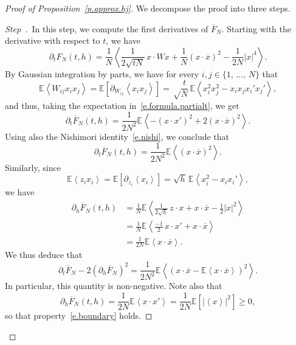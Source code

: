 \documentclass[10pt]{amsart}
\theoremstyle{definition}\newtheorem{defi}[theo]{Definition}\newtheorem{rema}[theo]{Remark}\newtheorem{exam}[theo]{Example}\newtheorem{exem}[theo]{Example}\newtheorem{nota}[theo]{Notation}
\newcommand{\E}{\mathbb{E}}
\newcommand{\1}{\mathds{1}}
\renewcommand{\ge}{\geqslant}
\newcommand{\la}{\left\langle}
\newcommand{\ra}{\right\rangle}
\renewcommand{\bar}{\overline}
\newcounter{stepcount}
\newenvironment{step}{\refstepcounter{stepcount}\begin{proof}[Step~\thestepcount]}{\let\qed\relax\end{proof}}
\begin{document}
\begin{proof}[Proof of Proposition~\ref{p.approx.hj}]
We decompose the proof into three steps.



\begin{step}\label{st1}
\,In this step, we compute the first derivatives of $\bar F_N$. Starting with the derivative with respect to $t$, we have
\begin{equation}\label{e.formula.partialt}
\partial_t F_N(t,{h}) = \frac 1 N\la \frac {1} {2\sqrt {t N}} \, x \cdot W x + \frac 1 N (x\cdot \bar x)^2 - \frac 1 {2N} |x|^4 \ra.
\end{equation}
By Gaussian integration by parts, we have for every $i,j \in \{1,\,\ldots,\,N\}$ that
\[
\E\la W_{ij} x_i x_j\ra  = \E \left[\partial_{W_{ij}} \la x_i x_j \ra \right] = \sqrt \frac{t}{N} \, \E \la x_i^2 x_j^2 - x_i x_j x_i' x_j' \ra,
\]
and thus, taking the expectation in~\eqref{e.formula.partialt}, we get
\[
\partial_t \bar F_N(t,{h}) = \frac {1}{2N^2} \E\la - \left(x \cdot x'\right)^2 + 2 \left(x\cdot \bar x\right)^2\ra.
\]
Using also the Nishimori identity~\eqref{e.nishi}, we conclude that
\begin{equation}\label{e.formula.partialtbar}
\partial_t \bar F_N(t,{h}) = \frac 1 {2N^2} \E \la (x \cdot \bar x)^2 \ra.
\end{equation}
Similarly, since
\begin{equation}\label{e.ibp.z}
\E \la z_i x_i \ra  = \E \left[\partial_{z_i} \la x_i \ra \right] = \sqrt{h} \, \E \la x_i^2 - x_i x_i' \ra,
\end{equation}
we have
\begin{align}
\partial_{h} \bar F_N(t,{h}) 
&=\frac 1 N \E \la \frac 1 {2\sqrt {h}} \, z \cdot x + x \cdot \bar x - \frac 1 2 |x|^2 \ra\label{e.formula.partialmu1}
\\
\nonumber & = \frac 1 N \E \la \frac {-1} 2 \, x \cdot x' + x \cdot \bar x \ra\\
& = \frac 1 {2N} \E \la x \cdot \bar x \ra.\label{e.formula.partialmu2}
\end{align}
We thus deduce that
\begin{equation}\label{e.variance.identity}
\partial_t \bar F_N - 2 \left(\partial_{h} \bar F_N\right)^2 = \frac 1 {2N^2} \E \la \left(x\cdot \bar x - \E\la x\cdot \bar x \ra \right)^2 \ra.
\end{equation}
In particular, this quantity is non-negative. Note also that
\begin{equation}\label{e.positivity}
\partial_h \bar F_N(t,h) = \frac 1 {2N} \E \la x \cdot x' \ra = \frac{1}{2N} \E \left[\left| \la x \ra\right|^2 \right] \ge 0,
\end{equation}
so that property~\eqref{e.boundary} holds.
\end{step}


\end{proof}
\end{document}
